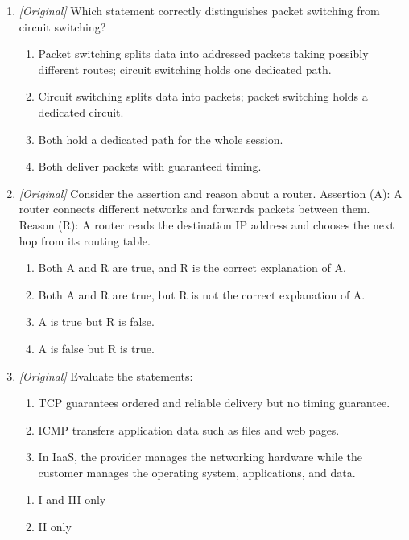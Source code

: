 \documentclass[11pt]{article}
\begin{document}
\begin{enumerate}[label=\textbf{Q\arabic*.}, leftmargin=*]
\begin{enumerate}[label=\Alph*.]
    \item a mail protocol that syncs mail across devices.
  \end{enumerate}
\item \textit{[Original]} Which statement correctly distinguishes packet
  switching from circuit switching?
  \begin{enumerate}[label=\Alph*.]
    \item Packet switching splits data into addressed packets taking possibly
      different routes; circuit switching holds one dedicated path.
    \item Circuit switching splits data into packets; packet switching holds a
      dedicated circuit.
    \item Both hold a dedicated path for the whole session.
    \item Both deliver packets with guaranteed timing.
  \end{enumerate}
\item \textit{[Original]} Consider the assertion and reason about a router.
  Assertion (A): A router connects different networks and forwards packets
  between them. Reason (R): A router reads the destination IP address and
  chooses the next hop from its routing table.
  \begin{enumerate}[label=\Alph*.]
    \item Both A and R are true, and R is the correct explanation of A.
    \item Both A and R are true, but R is not the correct explanation of A.
    \item A is true but R is false.
    \item A is false but R is true.
  \end{enumerate}
\item \textit{[Original]} Evaluate the statements:
  \begin{enumerate}[label=\Roman*.]
    \item TCP guarantees ordered and reliable delivery but no timing
      guarantee.
    \item ICMP transfers application data such as files and web pages.
    \item In IaaS, the provider manages the networking hardware while the
      customer manages the operating system, applications, and data.
  \end{enumerate}
  \begin{enumerate}[label=\Alph*.]
    \item I and III only
    \item II only

\end{enumerate}
\end{enumerate}
\end{document}
